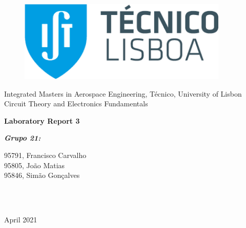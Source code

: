 \documentclass[11en, a4paper, oneside]{article}
\begin{document}
\begin{titlepage}
	\begin{center}
		\begin{figure}[htb!]
			\begin{center}
				\includegraphics[width=10cm]{../../figlib/tecnico.png}
			\end{center}
		\end{figure}
		
        \vspace{30pt}
        \begin{center}
        \Large{\center Integrated Masters in Aerospace Engineering, Técnico, University of Lisbon}\\
        \Large{\center Circuit Theory and Electronics Fundamentals}\\
        \end{center}
            
        \vspace{60pt}
        \Huge{\textbf{Laboratory Report 3}}
        
        \vspace{120pt}
        \begin{minipage}{0.4\textwidth}
		\begin{flushleft} \large
			\emph{\LARGE{\textbf{Grupo 21:}}}\par \vspace{10pt}
			95791, Francisco Carvalho \\ \vspace{20pt}
            95805, João Matias\\ \vspace{20pt}
            95846, Simão Gonçalves\\ \vspace{20pt}
		\end{flushleft}
	\end{minipage}
	~
	\begin{minipage}[b]{0.4\textwidth}
		\begin{flushright} \large
        	{}
		\end{flushright}
	\end{minipage}\\[2cm]
       \vspace{10pt}
        \large{April 2021}\\
	\end{center}
\end{titlepage}

\newpage
\renewcommand{\contentsname}{Índice}
\tableofcontents
\thispagestyle{empty}

\newpage
{}
\setcounter{page}{3}





\end{document}
